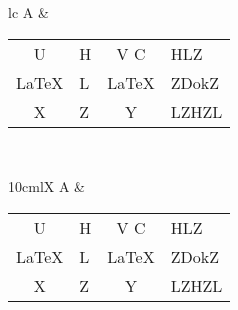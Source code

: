 \documentclass{article}
\begin{document}
  \bfseries

\begin{tabular}{lC}
    A &
    {%
    \begin{tabular}{|cTCT|}        \hline
    U      & H & V  C  & HLZ     \\
    \LaTeX & L & \LaTeX & ZD{{ok}}Z \\
    X      & Z & \hbox\bgroup Y\egroup      & LZHZL    \\ \hline
    \end{tabular}} \\
\end{tabular}

\begin{tabularx}{10cm}{lX}
    A &
    {%
    \begin{tabular}{|cTCT|}        \hline
    U      & H & V  C  & HLZ     \\
    \LaTeX & L & \LaTeX & ZD{{ok}}Z \\
    X      & Z & \hbox\bgroup Y\egroup      & LZHZL    \\ \hline
    \end{tabular}} \\
\end{tabularx}
\end{document}
